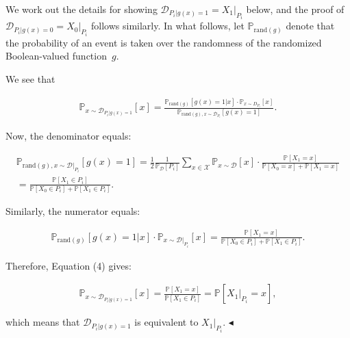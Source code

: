 We work out the details for showing $\mathcal{D}_{P_{i}|g(x)=1}=X_{1}|_{P_{i}}$ below, and the proof of $\mathcal{D}_{P_{i}|g(x)=0}=X_{0}|_{P_{i}}$ follows similarly. In what follows, let $\mathbb{P}_{\text{rand}(g)}$ denote that the probability of an event is taken over the randomness of the randomized Boolean-valued function $g$.\par




We see that\par


\[\begin{gathered}
\mathbb{P}_{x\sim\mathcal{D}_{P_{i}|g(x)=1}}\left[x\right]=\frac{\mathbb{P}_{\text{rand}(g)}[g(x)=1|x]\cdot\mathbb{P}_{x\sim D_{P_{i}}}[x]}{\mathbb{P}_{\text{rand}(g),x\sim\mathcal{D}_{P_{i}}}[g(x)=1]}.
\end{gathered}\]


Now, the denominator equals:\par


\[\begin{gathered}
\displaystyle\mathbb{P}_{\text{rand}(g),x\sim\mathcal{D}|_{P_{i}}}[g(x)=1] \displaystyle=\frac{1}{2}\frac{1}{\mathbb{P}_{\mathcal{D}}[P_{i}]}\sum_{x\in\mathcal{X}}\mathbb{P}_{x\sim\mathcal{D}}[x]\cdot\frac{\mathbb{P}[X_{1}=x]}{\mathbb{P}[X_{0}=x]+\mathbb{P}[X_{1}=x]} \\
\displaystyle=\frac{\mathbb{P}[X_{1}\in P_{i}]}{\mathbb{P}[X_{0}\in P_{i}]+\mathbb{P}[X_{1}\in P_{i}]}.
\end{gathered}\]


Similarly, the numerator equals:\par


\[\begin{gathered}
\mathbb{P}_{\text{rand}(g)}[g(x)=1|x]\cdot\mathbb{P}_{x\sim\mathcal{D}|_{P_{i}}}[x]=\frac{\mathbb{P}[X_{1}=x]}{\mathbb{P}[X_{0}\in P_{i}]+\mathbb{P}[X_{1}\in P_{i}]}.
\end{gathered}\]


Therefore, Equation (4) gives:\par


\[\begin{gathered}
\mathbb{P}_{x\sim\mathcal{D}_{P_{i}|g(x)=1}}\left[x\right]=\frac{\mathbb{P}[X_{1}=x]}{\mathbb{P}[X_{1}\in P_{i}]}=\mathbb{P}[X_{1}|_{P_{i}}=x],
\end{gathered}\]


which means that $\mathcal{D}_{P_{i}|g(x)=1}$ is equivalent to $X_{1}|_{P_{i}}$.
$\blacktriangleleft$\par




